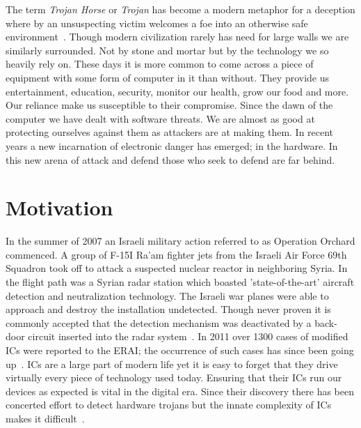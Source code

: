 \label{chapter:introduction}
The term \textit{Trojan Horse} or \textit{Trojan} has become a modern metaphor for a deception where by an unsuspecting victim welcomes a foe into an otherwise safe environment~\cite{searchForTrojanWar}.
Though modern civilization rarely has need for large walls we are similarly surrounded.
Not by stone and mortar but by the technology we so heavily rely on.
These days it is more common to come across a piece of equipment with some form of computer in it than without.
They provide us entertainment, education, security, monitor our health, grow our food and more.
Our reliance make us susceptible to their compromise.
Since the dawn of the computer we have dealt with software threats.
We are almost as good at protecting ourselves against them as attackers are at making them.
In recent years a new incarnation of electronic danger has emerged; in the hardware.
In this new arena of attack and defend those who seek to defend are far behind.

\section{Motivation}
In the summer of 2007 an Israeli military action referred to as Operation Orchard commenced.
A group of F-15I Ra'am fighter jets from the Israeli Air Force 69th Squadron took off to attack a suspected nuclear reactor in neighboring Syria.
In the flight path was a Syrian radar station which boasted 'state-of-the-art' aircraft detection and neutralization technology. 
The Israeli war planes were able to approach and destroy the installation undetected.
Though never proven it is commonly accepted that the detection mechanism was deactivated by a back-door circuit inserted into the radar system~\cite{stoppingHTsIEEESpectrum}.
In 2011 over 1300 cases of modified \acrshort{IC}s were reported to the \acrfull{ERAI}; the occurrence of such cases has since been going up~\cite{counterfeitIEEESpectrum}.
\acrfull{ICs} are a large part of modern life yet it is easy to forget that they drive virtually every piece of technology used today.
Ensuring that their \acrshort{IC}s run our devices as expected is vital in the digital era.
Since their discovery there has been concerted effort to detect hardware trojans but the innate complexity of \acrshort{IC}s makes it difficult~\cite{hardwareTrojanSurvey2015}.

